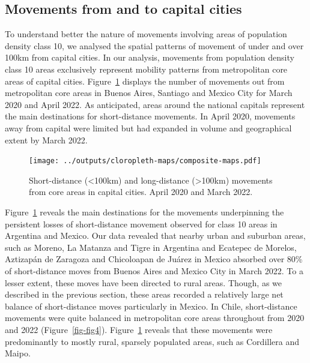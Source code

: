\documentclass[
  11pt,
]{article}
\begin{document}
\hypertarget{movements-from-and-to-capital-cities}{%
\subsection{Movements from and to capital
cities}\label{movements-from-and-to-capital-cities}}

To understand better the nature of movements involving areas of
population density class 10, we analysed the spatial patterns of
movement of under and over 100km from capital cities. In our analysis,
movements from population density class 10 areas exclusively represent
mobility patterns from metropolitan core areas of capital cities.
Figure~\ref{fig-fig6} displays the number of movements out from
metropolitan core areas in Buenos Aires, Santiago and Mexico City for
March 2020 and April 2022. As anticipated, areas around the national
capitals represent the main destinations for short-distance movements.
In April 2020, movements away from capital were limited but had expanded
in volume and geographical extent by March 2022.

\begin{figure}

{\centering \texttt{[image: ../outputs/cloropleth-maps/composite-maps.pdf]}

}

\caption{\label{fig-fig6}Short-distance (\textless100km) and
long-distance (\textgreater100km) movements from core areas in capital
cities. April 2020 and March 2022.}

\end{figure}

Figure~\ref{fig-fig6} reveals the main destinations for the movements
underpinning the persistent losses of short-distance movement observed
for class 10 areas in Argentina and Mexico. Our data revealed that
nearby urban and suburban areas, such as Moreno, La Matanza and Tigre in
Argentina and Ecatepec de Morelos, Aztizapán de Zaragoza and Chicoloapan
de Juárez in Mexico absorbed over 80\% of short-distance moves from
Buenos Aires and Mexico City in March 2022. To a lesser extent, these
moves have been directed to rural areas. Though, as we described in the
previous section, these areas recorded a relatively large net balance of
short-distance moves particularly in Mexico. In Chile, short-distance
movements were quite balanced in metropolitan core areas throughout from
2020 and 2022 (Figure~\ref{fig-fig4}). Figure~\ref{fig-fig6} reveals
that these movements were predominantly to mostly rural, sparsely
populated areas, such as Cordillera and Maipo.
\end{document}
